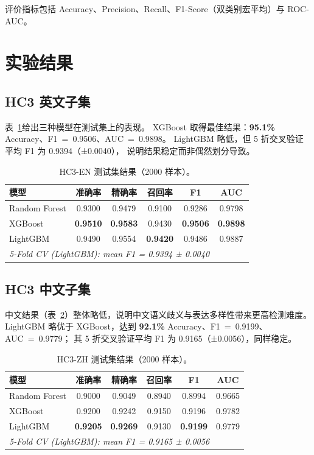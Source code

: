 \documentclass[sigconf]{acmart}
\begin{document}
评价指标包括 Accuracy、Precision、Recall、F1-Score（双类别宏平均）与 ROC-AUC。

\section{实验结果}

\subsection{HC3 英文子集}

表~\ref{tab:en_results}给出三种模型在测试集上的表现。
XGBoost 取得最佳结果：\textbf{95.1\%} Accuracy、F1~=~0.9506、AUC~=~0.9898。
LightGBM 略低，但 5 折交叉验证平均 F1 为 0.9394（±0.0040），
说明结果稳定而非偶然划分导致。

\begin{table}[h]
\centering
\caption{HC3-EN 测试集结果（2000 样本）。}
\label{tab:en_results}
\small
\begin{tabular}{lccccc}
\toprule
\textbf{模型} & \textbf{准确率} & \textbf{精确率} & \textbf{召回率} & \textbf{F1} & \textbf{AUC} \\
\midrule
Random Forest & 0.9300 & 0.9479 & 0.9100 & 0.9286 & 0.9798 \\
XGBoost       & \textbf{0.9510} & \textbf{0.9583} & 0.9430 & \textbf{0.9506} & \textbf{0.9898} \\
LightGBM      & 0.9490 & 0.9554 & \textbf{0.9420} & 0.9486 & 0.9887 \\
\midrule
\multicolumn{6}{l}{\textit{5-Fold CV (LightGBM): mean F1 = 0.9394 ± 0.0040}} \\
\bottomrule
\end{tabular}
\end{table}

\subsection{HC3 中文子集}

中文结果（表~\ref{tab:zh_results}）整体略低，说明中文语义歧义与表达多样性带来更高检测难度。
LightGBM 略优于 XGBoost，达到 \textbf{92.1\%} Accuracy、F1~=~0.9199、AUC~=~0.9779；
其 5 折交叉验证平均 F1 为 0.9165（±0.0056），同样稳定。

\begin{table}[h]
\centering
\caption{HC3-ZH 测试集结果（2000 样本）。}
\label{tab:zh_results}
\small
\begin{tabular}{lccccc}
\toprule
\textbf{模型} & \textbf{准确率} & \textbf{精确率} & \textbf{召回率} & \textbf{F1} & \textbf{AUC} \\
\midrule
Random Forest & 0.9000 & 0.9049 & 0.8940 & 0.8994 & 0.9665 \\
XGBoost       & 0.9200 & 0.9242 & 0.9150 & 0.9196 & 0.9782 \\
LightGBM      & \textbf{0.9205} & \textbf{0.9269} & 0.9130 & \textbf{0.9199} & 0.9779 \\
\midrule
\multicolumn{6}{l}{\textit{5-Fold CV (LightGBM): mean F1 = 0.9165 ± 0.0056}} \\
\bottomrule
\end{tabular}
\end{table}
\end{document}
